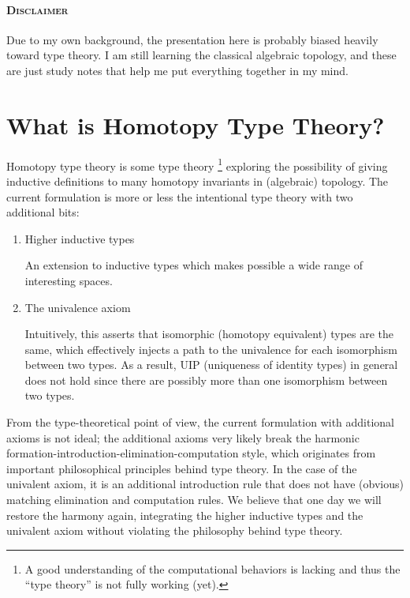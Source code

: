 \documentclass{article}
\begin{document}
\newcommand{\path}{\mathbin{=}}
\newcommand{\trunc}[2]{\| #2 \|_{#1}}
\newcommand{\proj}[2]{| #2 |_{#1}}
\newcommand{\fpbox}[1]{\fbox{\pbox[t]{\textwidth}{#1}}}
\newcommand{\suc}{\mathtt{suc}}
\newcommand{\TODO}[1]{\textcolor{Olive}{\fbox{\textsc{todo}} {#1}}}

\begin{mdframed}
  \paragraph{\textsc{Disclaimer}}
  Due to my own background, the presentation here is probably biased heavily toward type theory.
  I am still learning the classical algebraic topology, and these are just study notes that
  help me put everything together in my mind.
\end{mdframed}

\section{What is Homotopy Type Theory?}

Homotopy type theory is some type theory%
\footnote{A good understanding of the computational behaviors
  is lacking and thus the ``type theory'' is not fully working (yet).}
exploring the possibility of
giving inductive definitions to many homotopy invariants in (algebraic) topology.
The current formulation is more or less the intentional type theory
with two additional bits:
\begin{enumerate}
  \item Higher inductive types

    An extension to inductive types which makes possible
    a wide range of interesting spaces.

  \item The univalence axiom

    Intuitively, this asserts that isomorphic (homotopy equivalent) types are the same,
    which effectively injects a path to the univalence
    for each isomorphism between two types.
    As a result, UIP (uniqueness of identity types) in general
    does not hold since there are possibly more than one isomorphism
    between two types.
\end{enumerate}

From the type-theoretical point of view,
the current formulation with additional axioms is not ideal;
the additional axioms very likely break the harmonic
formation-introduction-elimination-computation style,
which originates from important philosophical principles behind type theory.
In the case of the univalent axiom,
it is an additional introduction rule
that does not have (obvious) matching elimination and computation rules.
We believe that one day we will restore the harmony again,
integrating the higher inductive types and the univalent axiom
without violating the philosophy behind type theory.
\end{document}
